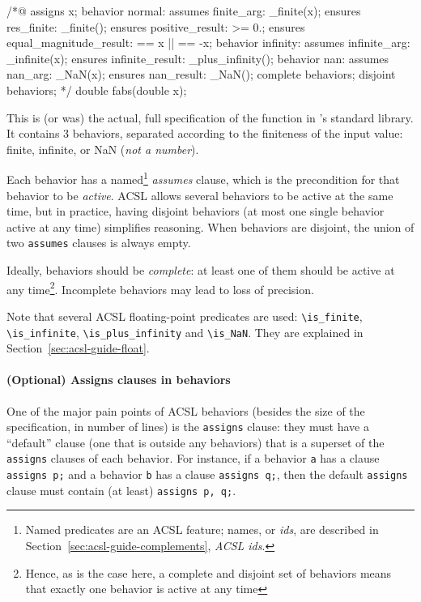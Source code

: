 \documentclass{frama-c-book}
\begin{document}
\begin{listing-nonumber}
/*@
  assigns \result \from x;
  behavior normal:
    assumes finite_arg: \is_finite(x);
    ensures res_finite: \is_finite(\result);
    ensures positive_result: \result >= 0.;
    ensures equal_magnitude_result: \result == x || \result == -x;
  behavior infinity:
    assumes infinite_arg: \is_infinite(x);
    ensures infinite_result: \is_plus_infinity(\result);
  behavior nan:
    assumes nan_arg: \is_NaN(x);
    ensures nan_result: \is_NaN(\result);
  complete behaviors;
  disjoint behaviors;
*/
double fabs(double x);
\end{listing-nonumber}

This is (or was) the actual, full specification of the function in \FramaC's
standard library. It contains 3 behaviors, separated according to the
finiteness of the input value: finite, infinite, or NaN ({\em not a number}).

Each behavior has a named\footnote{Named predicates are an ACSL feature; names,
or {\em ids}, are described in Section~\ref{sec:acsl-guide-complements},
{\em ACSL ids}.} {\em assumes} clause, which is the precondition for
that behavior to be {\em active}. ACSL allows several behaviors to be active
at the same time, but in practice, having disjoint behaviors (at most one single
behavior active at any time) simplifies reasoning. When behaviors are disjoint,
the union of two \texttt{assumes} clauses is always empty.

Ideally, behaviors should be {\em complete}: at least one of them should be
active at any time\footnote{Hence, as is the case here, a complete and disjoint set
of behaviors means that exactly one behavior is active at any time}.
Incomplete behaviors may lead to loss of precision.

Note that several ACSL floating-point predicates are used: \verb+\is_finite+,
\verb+\is_infinite+, \verb+\is_plus_infinity+ and \verb+\is_NaN+. They are
explained in Section~\ref{sec:acsl-guide-float}.

\paragraph{(Optional) Assigns clauses in behaviors}

One of the major pain points of ACSL behaviors (besides the size of the
specification, in number of lines) is the \texttt{assigns} clause:
they must have a ``default'' clause (one that is outside any behaviors)
that is a superset of the \texttt{assigns} clauses of each behavior.
For instance, if a behavior \texttt{a} has a clause \verb+assigns p;+
and a behavior \texttt{b} has a clause \verb+assigns q;+, then the
default \texttt{assigns} clause must contain (at least)
\verb+assigns p, q;+.
\end{document}
